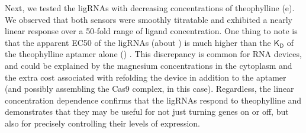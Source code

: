 \documentclass[10pt,oneside]{article}
\begin{document}


Next, we tested the ligRNAs with decreasing concentrations of theophylline (e).  We observed that both sensors were smoothly titratable and exhibited a nearly linear response over a 50-fold range of ligand concentration.  One thing to note is that the apparent EC50 of the ligRNAs (about ) is much higher than the $\mathsf{K_D}$ of the theophylline aptamer alone () \autocite{jenison1994}.  This discrepancy is common for RNA devices, and could be explained by the magnesium concentrations in the cytoplasm \autocite{carothers2010} and the extra cost associated with refolding the device in addition to the aptamer (and possibly assembling the Cas9 complex, in this case).  Regardless, the linear concentration dependence confirms that the ligRNAs respond to theophylline and demonstrates that they may be useful for not just turning genes on or off, but also for precisely controlling their levels of expression.


% 
% 
% 
% 
% 
% 

\end{document}
